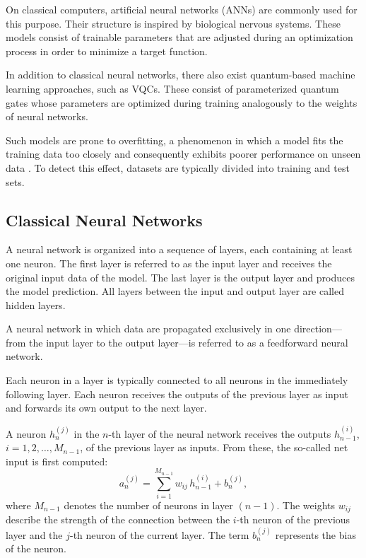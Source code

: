 On classical computers, artificial neural networks (ANNs) are commonly used for this purpose. Their structure is inspired by biological nervous systems. These models consist of trainable parameters that are adjusted during an optimization process in order to minimize a target function.

In addition to classical neural networks, there also exist quantum-based machine learning approaches, such as VQCs. These consist of parameterized quantum gates whose parameters are optimized during training analogously to the weights of neural networks.

Such models are prone to overfitting, a phenomenon in which a model fits the training data too closely and consequently exhibits poorer performance on unseen data \cite{Goodfellow-et-al-2016}. To detect this effect, datasets are typically divided into training and test sets.

\subsection{Classical Neural Networks}
\label{sec:bg-classical-nn}

A neural network is organized into a sequence of layers, each containing at least one neuron. The first layer is referred to as the input layer and receives the original input data of the model. The last layer is the output layer and produces the model prediction. All layers between the input and output layer are called hidden layers.

A neural network in which data are propagated exclusively in one direction—from the input layer to the output layer—is referred to as a feedforward neural network.

Each neuron in a layer is typically connected to all neurons in the immediately following layer. Each neuron receives the outputs of the previous layer as input and forwards its own output to the next layer.

A neuron $h_n^{(j)}$ in the $n$-th layer of the neural network receives the outputs
$h_{n-1}^{(i)}$, $i = 1,2,\ldots,M_{n-1}$, of the previous layer as inputs. From these, the so-called net input is first computed:
\begin{equation}
a_n^{(j)} = \sum_{i=1}^{M_{n-1}} w_{ij}\, h_{n-1}^{(i)} + b_n^{(j)},
\end{equation}
where $M_{n-1}$ denotes the number of neurons in layer $(n-1)$. The weights $w_{ij}$ describe the strength of the connection between the $i$-th neuron of the previous layer and the $j$-th neuron of the current layer. The term $b_n^{(j)}$ represents the bias of the neuron.

